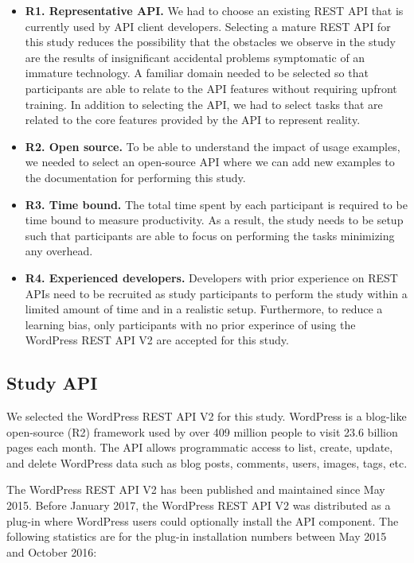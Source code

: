 \documentclass[conference]{IEEEtran}
\begin{document}
\begin{itemize}
  \item \textbf{R1. Representative API.} We had to choose an existing REST API that is currently used by API client developers. Selecting a mature REST API for this study reduces the possibility that the obstacles we observe in the study are the results of insignificant accidental problems symptomatic of an immature technology. A familiar domain needed to be selected so that participants are able to relate to the API features without requiring upfront training. In addition to selecting the API, we had to select tasks that are related to the core features provided by the API to represent reality.
  \item \textbf{R2. Open source.} To be able to understand the impact of usage examples, we needed to select an open-source API where we can add new examples to the documentation for performing this study.
  \item \textbf{R3. Time bound.} The total time spent by each participant is required to be time bound to measure productivity. As a result, the study needs to be setup such that participants are able to focus on performing the tasks minimizing any overhead.
  \item \textbf{R4. Experienced developers.} Developers with prior experience on REST APIs need to be recruited as study participants to perform the study within a limited amount of time and in a realistic setup. Furthermore, to reduce a learning bias, only participants with no prior experince of using the WordPress REST API V2 are accepted for this study.
\end{itemize}


\subsection{Study API} %

We selected the WordPress REST API V2 for this study. WordPress is a blog-like open-source (R2) framework used by over 409 million people to visit 23.6 billion pages each month. The API allows programmatic access to list, create, update, and delete WordPress data such as blog posts, comments, users, images, tags, etc.

The WordPress REST API V2 has been published and maintained since May 2015. Before January 2017, the WordPress REST API V2 was distributed as a plug-in where WordPress users could optionally install the API component. The following statistics are for the plug-in installation numbers between May 2015 and October 2016:
\end{document}
